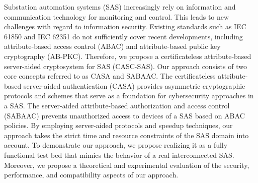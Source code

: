 \Abstract
Substation automation systems (SAS) increasingly rely on information and communication technology for monitoring and control.
This leads to new challenges with regard to information security.
Existing standards such as IEC 61850 and IEC 62351 do not sufficiently cover recent developments, including attribute-based access control (ABAC) and attribute-based public key cryptography (AB-PKC).
Therefore, we propose a certificateless attribute-based server-aided cryptosystem for SAS (CASC-SAS).
Our approach consists of two core concepts referred to as CASA and SABAAC.
The certificateless attribute-based server-aided authentication (CASA) provides asymmetric cryptographic protocols and schemes that serve as a foundation for cybersecurity approaches in a SAS.
The server-aided attribute-based authorization and access control (SABAAC) prevents unauthorized access to devices of a SAS based on ABAC policies.
By employing server-aided protocols and speedup techniques, our approach takes the strict time and resource constraints of the SAS domain into account.
To demonstrate our approach, we propose realizing it as a fully functional test bed that mimics the behavior of a real interconnected SAS.
Moreover, we propose a theoretical and experimental evaluation of the security, performance, and compatibility aspects of our approach.
